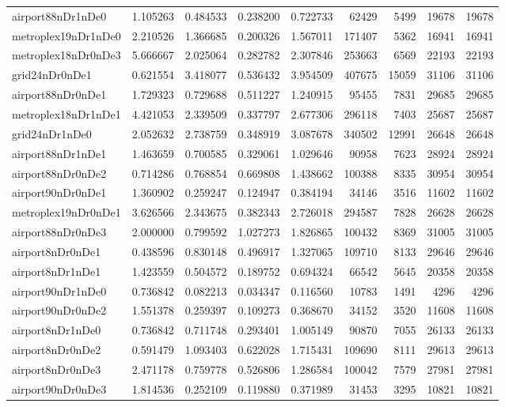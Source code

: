 \documentclass[../../../thesis.tex]{subfiles}
\begin{document}
\begin{longtable}{|l|r|r|r|r|r|r|r|r|}
airport88nDr1nDe0 & 1.105263 & 0.484533 & 0.238200 & 0.722733 & 62429 & 5499 & 19678 & 19678 \\
metroplex19nDr1nDe0 & 2.210526 & 1.366685 & 0.200326 & 1.567011 & 171407 & 5362 & 16941 & 16941 \\
metroplex18nDr0nDe3 & 5.666667 & 2.025064 & 0.282782 & 2.307846 & 253663 & 6569 & 22193 & 22193 \\
grid24nDr0nDe1 & 0.621554 & 3.418077 & 0.536432 & 3.954509 & 407675 & 15059 & 31106 & 31106 \\
airport88nDr0nDe1 & 1.729323 & 0.729688 & 0.511227 & 1.240915 & 95455 & 7831 & 29685 & 29685 \\
metroplex18nDr1nDe1 & 4.421053 & 2.339509 & 0.337797 & 2.677306 & 296118 & 7403 & 25687 & 25687 \\
grid24nDr1nDe0 & 2.052632 & 2.738759 & 0.348919 & 3.087678 & 340502 & 12991 & 26648 & 26648 \\
airport88nDr1nDe1 & 1.463659 & 0.700585 & 0.329061 & 1.029646 & 90958 & 7623 & 28924 & 28924 \\
airport88nDr0nDe2 & 0.714286 & 0.768854 & 0.669808 & 1.438662 & 100388 & 8335 & 30954 & 30954 \\
airport90nDr0nDe1 & 1.360902 & 0.259247 & 0.124947 & 0.384194 & 34146 & 3516 & 11602 & 11602 \\
metroplex19nDr0nDe1 & 3.626566 & 2.343675 & 0.382343 & 2.726018 & 294587 & 7828 & 26628 & 26628 \\
airport88nDr0nDe3 & 2.000000 & 0.799592 & 1.027273 & 1.826865 & 100432 & 8369 & 31005 & 31005 \\
airport8nDr0nDe1 & 0.438596 & 0.830148 & 0.496917 & 1.327065 & 109710 & 8133 & 29646 & 29646 \\
airport8nDr1nDe1 & 1.423559 & 0.504572 & 0.189752 & 0.694324 & 66542 & 5645 & 20358 & 20358 \\
airport90nDr1nDe0 & 0.736842 & 0.082213 & 0.034347 & 0.116560 & 10783 & 1491 & 4296 & 4296 \\
airport90nDr0nDe2 & 1.551378 & 0.259397 & 0.109273 & 0.368670 & 34152 & 3520 & 11608 & 11608 \\
airport8nDr1nDe0 & 0.736842 & 0.711748 & 0.293401 & 1.005149 & 90870 & 7055 & 26133 & 26133 \\
airport8nDr0nDe2 & 0.591479 & 1.093403 & 0.622028 & 1.715431 & 109690 & 8111 & 29613 & 29613 \\
airport8nDr0nDe3 & 2.471178 & 0.759778 & 0.526806 & 1.286584 & 100042 & 7579 & 27981 & 27981 \\
airport90nDr0nDe3 & 1.814536 & 0.252109 & 0.119880 & 0.371989 & 31453 & 3295 & 10821 & 10821 \\

\end{longtable}
\end{document}
